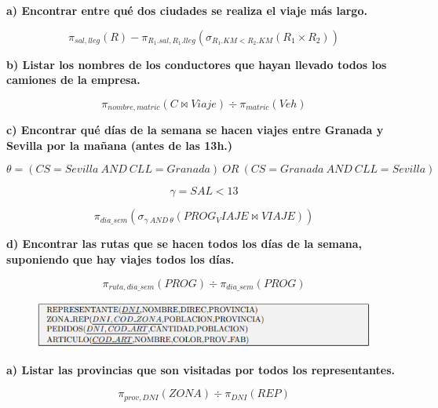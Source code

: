 \documentclass[a4paper,11pt]{article}
\begin{document}
\textbf{a) Encontrar entre qué dos ciudades se realiza el viaje más largo.}

\begin{equation*}
\pi_{sal,lleg}(R)-\pi_{R_1.sal,R_1.lleg}(\sigma_{R_1.KM<R_2.KM}(R_1\times R_2))
\end{equation*}

\textbf{b) Listar los nombres de los conductores que hayan llevado todos los camiones de
la empresa.}

\begin{equation*}
\pi_{nombre,matric}(C\Join Viaje)\div \pi_{matric}(Veh)
\end{equation*}

\textbf{c) Encontrar qué días de la semana se hacen viajes entre Granada y Sevilla por
la mañana (antes de las 13h.)}

\begin{equation*}
\theta=(CS=Sevilla \> AND \> CLL=Granada) \> OR \> (CS=Granada \>AND \>CLL=Sevilla)
\end{equation*}

\begin{equation*}
\gamma=SAL<13 
\end{equation*}

\begin{equation*}
\pi_{dia\_sem}(\sigma_{\gamma \> AND \> \theta}(PROG_VIAJE\Join VIAJE))
\end{equation*}

\textbf{d) Encontrar las rutas que se hacen todos los días de la semana, suponiendo que
hay viajes todos los días.}

\begin{equation*}
\pi_{ruta,dia\_sem}(PROG) \div \pi_{dia\_sem}(PROG)
\end{equation*}

\begin{figure}[h]
\centering
\includegraphics[scale=1,width=1\textwidth]{ejer5.png}
\end{figure}

\textbf{a) Listar las provincias que son visitadas por todos los representantes.}

\begin{equation*}
\pi_{prov,DNI}(ZONA)\div \pi_{DNI}(REP)
\end{equation*}
\end{document}
